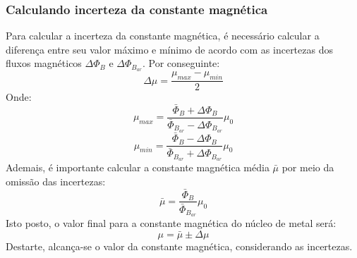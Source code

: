 \documentclass[column,brazilian,12pt,a4paper,final]{article}
\begin{document}
      \subsubsection{Calculando incerteza da constante magnética}
        Para calcular a incerteza da constante magnética, é necessário 
        calcular a diferença entre seu valor máximo e mínimo de acordo com
        as incertezas dos fluxos magnéticos $\Delta \Phi_B$ e 
        $\Delta \Phi_{B_{ar}}$. Por conseguinte: 
        \begin{equation}
          \Delta \mu = \frac{\mu_{max} - \mu_{min}}{2}
        \end{equation}
        Onde:
        \begin{equation}
          \mu_{max} = \frac{\bar{\Phi}_B + \Delta \Phi_B}
          {\bar{\Phi}_{B_{ar}} - \Delta \Phi_{B_{ar}}} \mu_0
        \end{equation}
        \begin{equation}
          \mu_{min} = \frac{\bar{\Phi}_B - \Delta \Phi_B}
          {\bar{\Phi}_{B_{ar}} + \Delta \Phi_{B_{ar}}} \mu_0
        \end{equation}
        Ademais, é importante calcular a constante magnética média 
        $\bar{\mu}$ por meio
        da omissão das incertezas:
        \begin{equation}
          \bar{\mu} = \frac{\bar{\Phi}_B}{\bar{\Phi}_{B_{ar}}} \mu_0
        \end{equation}
        Isto posto, o valor final para a constante magnética do núcleo
        de metal será:
        \begin{equation}
          \mu = \bar{\mu} \pm \Delta \mu
        \end{equation}
        Destarte, alcança-se o valor da constante magnética, considerando as 
        incertezas.
\end{document}
